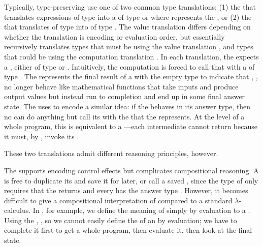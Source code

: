 Typically, type-preserving  use one of two common type translations: (1)
the  that translates expressions of
type  into a  of type  or
 where  represents the ,
or (2) the  that translates
 of type  into  of type .
The value translation differs depending on whether the translation is
encoding  or  evaluation order, but essentially recursively
translates types that must be  using the value translation \im{^+},
and types that could be  using the computation
translation \im{^\div}.
In each translation, the  expects a ,
either of type  or .
Intuitively, the computation is forced to call that  with
a  of type .
The  represents the final result of a
 with the empty type \False to indicate that 
, \ie,  no longer behave like mathematical
functions that take inputs and produce output values but instead run to
completion and end up in some final answer state.
The  uses  to encode a
similar idea: if the  behaves  in its
answer type, then no  can do anything but call its
 with the  that the
 represents.
At the level of a whole program, this is equivalent to a 
---each intermediate  cannot return
because it must, by , invoke its .

These two translations admit different reasoning principles, however.

The  supports encoding control
effects but complicates compositional reasoning.
A  is free to duplicate its  and save it
for later, or call a saved , since the type of
 only requires that the  returns \im{\False} and
every  has the answer type \im{\False}.
However, it becomes difficult to give a compositional interpretation
of  compared to a standard \(\lambda\)-calculus.
In \slang, for example, we define the meaning of  simply by
evaluation to a .
Using the ,  
, so we cannot easily define the  of an
 by evaluation; we have to complete it first to get a whole
program, then evaluate it, then look at the final state.

